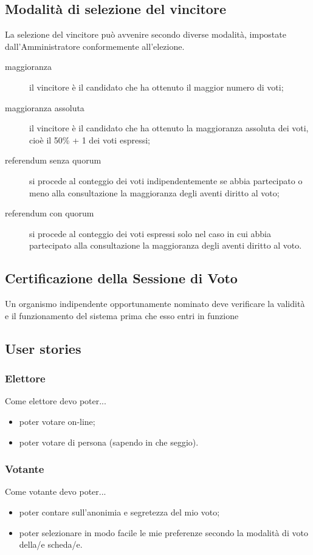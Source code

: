 \documentclass{report}
\begin{document}
\subsection{Modalità di selezione del vincitore}
La selezione del vincitore può avvenire secondo diverse modalità, impostate dall'Amministratore conformemente all'elezione.
\begin{description}
	\item[maggioranza] il vincitore è il candidato che ha ottenuto il maggior numero di voti;
	\item[maggioranza assoluta] il vincitore è il candidato che ha ottenuto la maggioranza assoluta dei voti, cioè il 50\% + 1 dei voti espressi;
	\item[referendum senza quorum] si procede al conteggio dei voti indipendentemente se abbia partecipato o meno alla consultazione la maggioranza degli aventi diritto al voto; 
	\item[referendum con quorum] si procede al conteggio dei voti espressi solo nel caso in cui abbia partecipato alla consultazione la maggioranza degli aventi diritto al voto.
\end{description}


\subsection{Certificazione della Sessione di Voto}
Un organismo indipendente opportunamente nominato deve verificare la validità e il funzionamento del sistema prima che esso entri in funzione


\subsection{User stories}

\subsubsection{Elettore}
Come elettore devo poter...
\begin{itemize}
	\item poter votare on-line;
	\item poter votare di persona (sapendo in che seggio).
\end{itemize}

\subsubsection{Votante}
Come votante devo poter...
\begin{itemize}
	\item poter contare sull'anonimia e segretezza del mio voto;
	\item poter selezionare in modo facile le mie preferenze secondo la modalità di voto della/e scheda/e.
\end{itemize}
\end{document}
